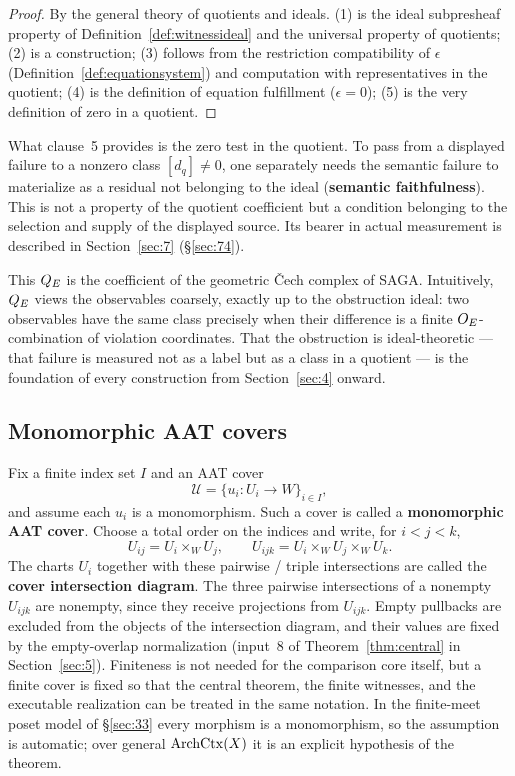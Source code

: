 \begin{proof}
By the general theory of quotients and ideals. (1) is the ideal
subpresheaf property of Definition~\ref{def:witnessideal} and the
universal property of quotients; (2) is a construction; (3) follows from
the restriction compatibility of $\epsilon$
(Definition~\ref{def:equationsystem}) and computation with
representatives in the quotient; (4) is the definition of equation
fulfillment ($\epsilon=0$); (5) is the very definition of zero in a
quotient.
\end{proof}

What clause~5 provides is the zero test in the quotient. To pass from a
displayed failure to a nonzero class $[d_q]\neq0$, one separately needs
the semantic failure to materialize as a residual not belonging to the
ideal (\textbf{semantic faithfulness}). This is not a property of the
quotient coefficient but a condition belonging to the selection and
supply of the displayed source. Its bearer in actual measurement is
described in Section~\ref{sec:7} (\S\ref{sec:74}).

This $Q_{E}$ is the coefficient of the geometric \v{C}ech complex of SAGA.
Intuitively, $Q_{E}$ views the observables coarsely, exactly up to the
obstruction ideal: two observables have the same class precisely when
their difference is a finite $O_{E}$-combination of violation
coordinates. That the obstruction is ideal-theoretic --- that failure is
measured not as a label but as a class in a quotient --- is the
foundation of every construction from Section~\ref{sec:4} onward.

\subsection{Monomorphic AAT covers}\label{sec:37}

Fix a finite index set $I$ and an AAT cover
\[
\mathcal U=\{u_i:U_i\to W\}_{i\in I},
\]
and assume each $u_i$ is a monomorphism. Such a cover is called a
\textbf{monomorphic AAT cover}. Choose a total order on the indices and
write, for $i<j<k$,
\[
U_{ij}=U_i\times_W U_j,\qquad
U_{ijk}=U_i\times_W U_j\times_W U_k.
\]
The charts $U_i$ together with these pairwise / triple intersections are
called the \textbf{cover intersection diagram}. The three pairwise
intersections of a nonempty $U_{ijk}$ are nonempty, since they receive
projections from $U_{ijk}$. Empty pullbacks are excluded from the
objects of the intersection diagram, and their values are fixed by the
empty-overlap normalization (input~8 of Theorem~\ref{thm:central} in
Section~\ref{sec:5}). Finiteness is not needed for the comparison core
itself, but a finite cover is fixed so that the central theorem, the
finite witnesses, and the executable realization can be treated in the
same notation. In the finite-meet poset model of \S\ref{sec:33} every
morphism is a monomorphism, so the assumption is automatic; over general
$\mathrm{ArchCtx}(X)$ it is an explicit hypothesis of the theorem.

